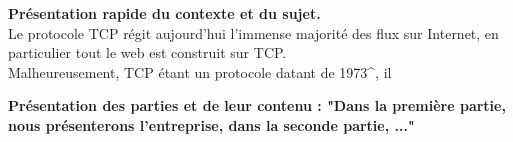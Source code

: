 \textbf{Présentation rapide du contexte et du sujet.}\\

Le protocole TCP régit aujourd'hui l'immense majorité des flux sur Internet, en particulier tout le web est construit sur TCP.\\
Malheureusement, TCP étant un protocole datant de 1973^{\cite{tcp}}, il 

\textbf{Présentation des parties et de leur contenu : "Dans la première partie, nous présenterons l'entreprise, dans la seconde partie, ..."}\\
\lipsum[2]\\